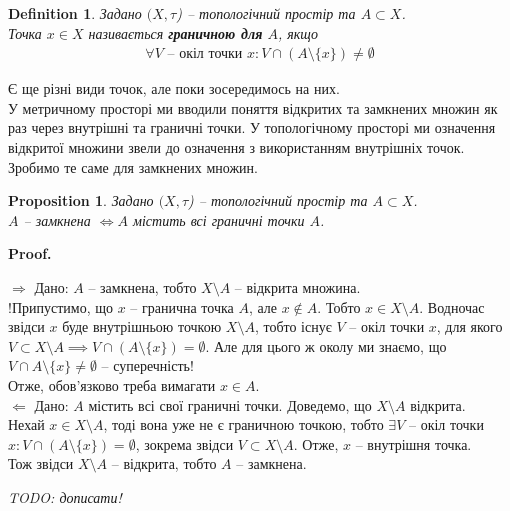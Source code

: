 \documentclass[a4paper, 10pt]{article}
\makeatletter
\def\rightproof{$\boxed{\Rightarrow}$ }
\def\leftproof{$\boxed{\Leftarrow}$ }
\theoremstyle{theoremdd}
\newtheorem{definition}[theorem]{Definition}
\newtheorem{proposition}[theorem]{Proposition}
\renewenvironment{proof}[1][Proof.\\]{\par
\pushQED{\hfill \qed}%
\normalfont \topsep6\p@\@plus6\p@\relax
\trivlist
\item\relax
{\bfseries
#1\@addpunct{.}}\hspace\labelsep\ignorespaces
}{%
\popQED\endtrivlist\@endpefalse
}
\makeatother
\begin{document}
\begin{definition}
Задано $(X,\tau$) -- топологічний простір та $A \subset X$.\\
Точка $x \in X$ називається \textbf{граничною для} $A$, якщо
\begin{align*}
\forall V \text{ -- окіл точки } x: V \cap (A \setminus \{x\}) \neq \emptyset
\end{align*}
\end{definition}
\noindent Є ще різні види точок, але поки зосередимось на них.\\
У метричному просторі ми вводили поняття відкритих та замкнених множин як раз через внутрішні та граничні точки. У топологічному просторі ми означення відкритої множини звели до означення з використанням внутрішніх точок. Зробимо те саме для замкнених множин.

\begin{proposition}
Задано $(X,\tau$) -- топологічний простір та $A \subset X$.\\
$A$ -- замкнена $\iff A$ містить всі граничні точки $A$.
\end{proposition}

\begin{proof}
\rightproof Дано: $A$ -- замкнена, тобто $X \setminus A$ -- відкрита множина.\\
!Припустимо, що $x$ -- гранична точка $A$, але $x \notin A$. Тобто $x \in X \setminus A$. Водночас звідси $x$ буде внутрішньою точкою $X \setminus A$, тобто існує $V$ -- окіл точки $x$, для якого $V \subset X \setminus A \implies V \cap (A \setminus \{x\}) = \emptyset$. Але для цього ж околу ми знаємо, що $V \cap A \setminus \{x\} \neq \emptyset$ -- суперечність!\\
Отже, обов'язково треба вимагати $x \in A$.
\bigskip \\
\leftproof Дано: $A$ містить всі свої граничні точки. Доведемо, що $X \setminus A$ відкрита.\\
Нехай $x \in X \setminus A$, тоді вона уже не є граничною точкою, тобто $\exists V$ -- окіл точки $x: V \cap (A \setminus \{x\}) = \emptyset$, зокрема звідси $V \subset X \setminus A$. Отже, $x$ -- внутрішня точка.\\
Тож звідси $X \setminus A$ -- відкрита, тобто $A$ -- замкнена.
\end{proof}

\textit{TODO: дописати!}
\end{document}
